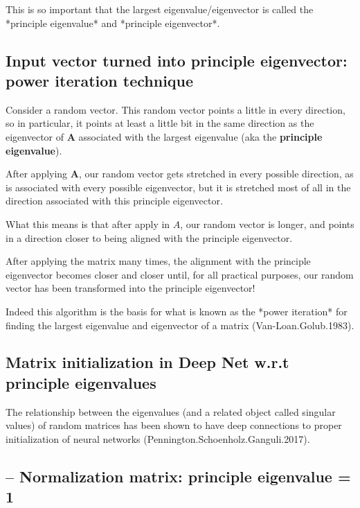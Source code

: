 This is so important that the largest eigenvalue/eigenvector is called the
*principle eigenvalue* and *principle eigenvector*.


\subsection{Input vector turned into principle eigenvector: power iteration technique}
\label{sec:principle-eigenvalue}

Consider a random vector.
This random vector points a little in every direction, so in particular, it
points at least a little bit in the same direction as the eigenvector of
$\mathbf{A}$ associated with the largest eigenvalue (aka the {\bf principle
eigenvalue}).

After applying $\mathbf{A}$, our random vector gets stretched in every possible
direction, as is associated with every possible eigenvector, but it is stretched
most of all in the direction associated with this principle eigenvector.

What this means is that after apply in $A$, our random vector is longer, and
points in a direction closer to being aligned with the principle eigenvector.

After applying the matrix many times, the alignment with the principle
eigenvector becomes closer and closer until, for all practical purposes, our
random vector has been transformed into the principle eigenvector!

\begin{mdframed}

Indeed this algorithm is the basis for what is known as the *power iteration*
for finding the largest eigenvalue and eigenvector of a matrix (Van-Loan.Golub.1983).

\end{mdframed}

\subsection{Matrix initialization in Deep Net w.r.t principle eigenvalues}
\label{sec:matrix-initialization}

The relationship between the eigenvalues (and a related object called singular
values) of random matrices has been shown to have deep connections to proper
initialization of neural networks (Pennington.Schoenholz.Ganguli.2017).

\subsection{-- Normalization matrix: principle eigenvalue = 1}
\label{sec:normalization-eigenvalue}

